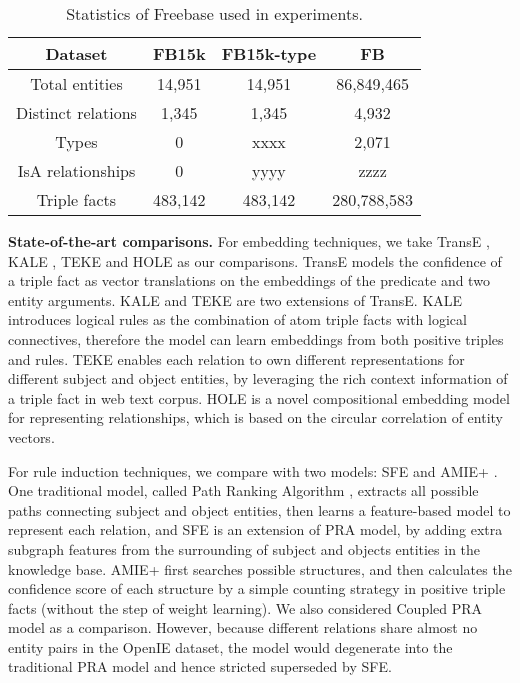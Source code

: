 \begin{table}[ht]
	\small
	\centering
	\caption{Statistics of Freebase used in experiments. }
	\begin{tabular}{|c|c|c|c|}
		\hline
		Dataset				&	FB15k	&	FB15k-type	&	 FB		\\
        \hline
		Total entities		&	14,951	&	14,951	&	86,849,465	 \\
		\hline
		Distinct relations	&	1,345	&	1,345	&	4,932	\\
        \hline
		Types 				&	0		&	xxxx	&	2,071	\\
		\hline
		IsA relationships	&	0		&	yyyy	&	zzzz	\\
		\hline
		Triple facts		&	483,142	&	483,142	& 280,788,583	\\
		\hline
	\end{tabular}%
	\label{tab:fb-size}%
\end{table}


\noindent
\textbf{State-of-the-art comparisons.}
For embedding techniques, we take TransE \cite{bordes2013translating},
KALE \cite{guo2016jointly}, TEKE \cite{wang2016text} and 
HOLE \cite{} as our comparisons.
TransE models the confidence of a triple fact as vector translations on the
embeddings of the predicate and two entity arguments.
KALE and TEKE are two extensions of TransE.
KALE introduces logical rules as the combination of atom triple facts with logical connectives,
therefore the model can learn embeddings from both positive triples and rules.
TEKE enables each relation to own different representations for different subject and object
entities, by leveraging the rich context information of a triple fact in web text corpus.
HOLE is a novel compositional embedding model for representing relationships,
which is based on the circular correlation of entity vectors.

For rule induction techniques, we compare with two models:
SFE \cite{gardner2015efficient} and AMIE+ \cite{}.
One traditional model, called Path Ranking Algorithm \cite{lao2011random},
extracts all possible paths connecting subject and object entities,
then learns a feature-based model to represent each relation,
and SFE is an extension of PRA model, by adding extra subgraph features 
from the surrounding of subject and objects entities in the knowledge base.
AMIE+ first searches possible structures, and then calculates the confidence score 
of each structure by a simple counting strategy in positive triple facts
(without the step of weight learning).
We also considered Coupled PRA model \cite{} as a comparison. However, 
because different relations share almost no entity
pairs in the OpenIE dataset,
the model would degenerate into the traditional PRA model
and hence stricted superseded by SFE.

